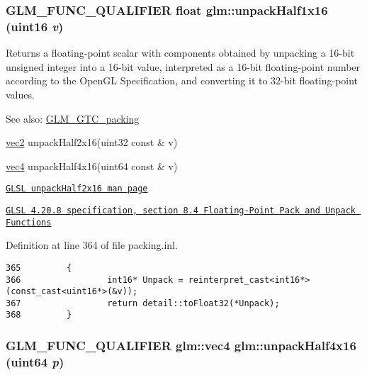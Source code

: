 \hypertarget{group__gtc__packing_ga6eebcdfc746584b7d1823f1d5344fed}{
\subsubsection[unpackHalf1x16]{\setlength{\rightskip}{0pt plus 5cm}GLM\_\-FUNC\_\-QUALIFIER float glm::unpackHalf1x16 (uint16 {\em v})}}
\label{group__gtc__packing_ga6eebcdfc746584b7d1823f1d5344fed}


Returns a floating-point scalar with components obtained by unpacking a 16-bit unsigned integer into a 16-bit value, interpreted as a 16-bit floating-point number according to the OpenGL Specification, and converting it to 32-bit floating-point values.

\begin{Desc}
\item[See also:]\hyperlink{group__gtc__packing}{GLM\_\-GTC\_\-packing} 

\hyperlink{group__core__types_ga1618f51db67eaa145db101d8c8431d8}{vec2} unpackHalf2x16(uint32 const \& v) 

\hyperlink{group__core__types_g5881b1b022d7fd1b7218f5916532dd02}{vec4} unpackHalf4x16(uint64 const \& v) 

\href{http://www.opengl.org/sdk/docs/manglsl/xhtml/unpackHalf2x16.xml}{\tt GLSL unpackHalf2x16 man page} 

\href{http://www.opengl.org/registry/doc/GLSLangSpec.4.20.8.pdf}{\tt GLSL 4.20.8 specification, section 8.4 Floating-Point Pack and Unpack Functions} \end{Desc}


Definition at line 364 of file packing.inl.

\begin{Code}\begin{verbatim}365         {
366                 int16* Unpack = reinterpret_cast<int16*>(const_cast<uint16*>(&v));
367                 return detail::toFloat32(*Unpack);
368         }
\end{verbatim}
\end{Code}


\hypertarget{group__gtc__packing_gea526d6491ad40401eac34803984bf27}{
\subsubsection[unpackHalf4x16]{\setlength{\rightskip}{0pt plus 5cm}GLM\_\-FUNC\_\-QUALIFIER {\bf glm::vec4} glm::unpackHalf4x16 (uint64 {\em p})}}
\label{group__gtc__packing_gea526d6491ad40401eac34803984bf27}



